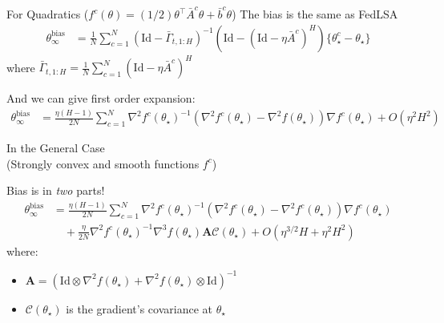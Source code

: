 \documentclass[aspectratio=169,14pt]{beamer}
\begin{document}
  \begin{frame}{\Large For Quadratics ($f^c(\theta) = (1/2)\theta^\top \bar{A}^c \theta + \bar{b}^c \theta$)}
    The bias is the same as FedLSA
    \begin{align*}
      \theta_\infty^{\text{bias}}
      & =
        \frac{1}{N}
        \sum_{c=1}^N
        (\text{Id} - \bar{\Gamma}_{t,1:H})^{-1} 
        (\text{Id} - (\text{Id}- \eta \bar{A}^c)^H)\{ \theta_\star^c - \theta_\star \}
    \end{align*}
    where $\bar{\Gamma}_{t,1:H} = \tfrac{1}{N} \sum_{c=1}^N (\text{Id}- \eta \bar{A}^c)^H$

    \pause
    
    And we can give first order expansion:
    \begin{align*}
      \!\!\!\!\theta_\infty^{\text{bias}}
      & \!=\!
        \frac{\eta(H -1)}{2 N}
        \sum_{c=1}^N 
        \nabla^2 f^c(\theta_\star)^{-1} 
        (\nabla^2 f^c(\theta_\star) \!-\!  \nabla^2 f(\theta_\star)) \nabla f^c(\theta_\star)
        \!+\! O(\eta^2 H^2)
    \end{align*}
    
  \end{frame}

  \begin{frame}{In the General Case\\[-0.5em]
      \small (Strongly convex and smooth functions $f^c$)}

    Bias is in \emph{two} parts!
    \begin{align*}
      \theta_\infty^{\text{bias}}
      & =
        \frac{\eta(H -1)}{2 N}
        \sum_{c=1}^N 
        \nabla^2 f^c(\theta_\star)^{-1} 
        (\nabla^2 f^c(\theta_\star) -  \nabla^2 f^c(\theta_\star)) \nabla f^c(\theta_\star)
      \\
      & \quad
        + \frac{\eta}{2 N} \nabla^2 f^c(\theta_\star)^{-1} \nabla^3 f(\theta_\star) \textbf{A} \mathcal{C}(\theta_\star)
        + O(\eta^{3/2} H + \eta^2 H^2)
    \end{align*}
    \small 
    where:

    \vspace{-1em}
    
    \begin{itemize}
    \item $\textbf{A} = (\text{Id} \otimes \nabla^2 f(\theta_\star) + \nabla^2 f(\theta_\star) \otimes \text{Id})^{-1}$
    \item  $\mathcal{C}(\theta_\star)$ is the gradient's covariance at $\theta_\star$
    \end{itemize}
    
    
  \end{frame}
\end{document}
